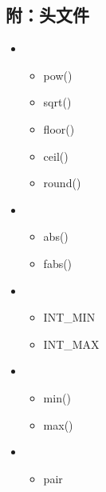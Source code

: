 \documentclass[letterpaper,10pt,english]{sphinxmanual}
\begin{document}
\begin{DUlineblock}{0em}
\item[] 
\end{DUlineblock}


\subsection{附：头文件}
\label{\detokenize{cpp/18_commonFunc:id2}}\begin{itemize}
\item {} 
\begin{itemize}
\item {} 
pow()

\item {} 
sqrt()

\item {} 
floor()

\item {} 
ceil()

\item {} 
round()

\end{itemize}

\item {} 
\begin{itemize}
\item {} 
abs()

\item {} 
fabs()

\end{itemize}

\item {} 
\begin{itemize}
\item {} 
INT\_MIN

\item {} 
INT\_MAX

\end{itemize}

\item {} 
\begin{itemize}
\item {} 
min()

\item {} 
max()

\end{itemize}

\item {} 
\begin{itemize}
\item {} 
pair


\end{itemize}
\end{itemize}
\end{document}
